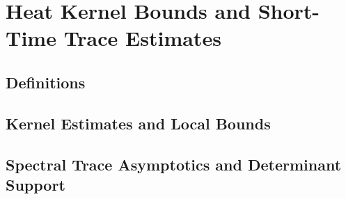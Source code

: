 \section{Heat Kernel Bounds and Short-Time Trace Estimates}
\label{sec:heat_kernel_asymptotics}



\subsection{Definitions}


\subsection{Kernel Estimates and Local Bounds}













\subsection{Spectral Trace Asymptotics and Determinant Support}




